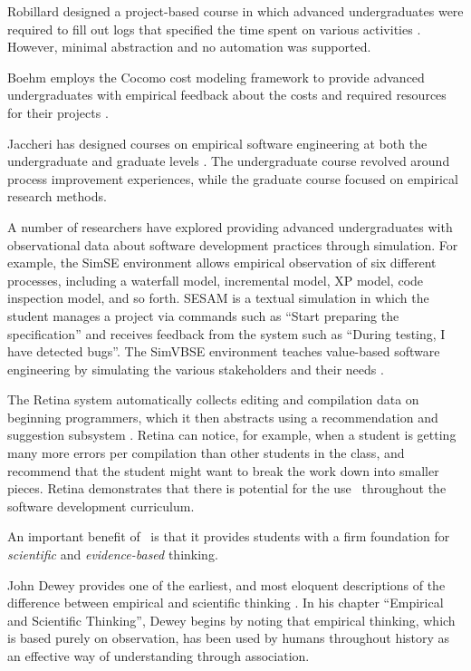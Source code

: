 Robillard designed a project-based course in which advanced undergraduates were required
to fill out logs that specified the time spent on various activities
\citep{Robillard98}.  However, minimal abstraction and no automation was supported.

Boehm employs the Cocomo cost modeling framework to provide advanced undergraduates with
empirical feedback about the costs and required resources for their
projects \citep{Valerdi07}.

Jaccheri has designed courses on empirical software engineering at both the 
undergraduate and graduate levels \citep{Dingsoyr99,Jaccheri05}.  The undergraduate course 
revolved around process improvement experiences, while the graduate course focused on 
empirical research methods.  

A number of researchers have explored providing advanced undergraduates
with observational data about software development practices through
simulation.  For example, the SimSE environment \citep{Navarro07,Navarro09}
allows empirical observation of six different processes, including a
waterfall model, incremental model, XP model, code inspection model, and so
forth.  SESAM \citep{Drappa00} is a textual simulation in which the student
manages a project via commands such as ``Start preparing the
specification'' and receives feedback from the system such as ``During
testing, I have detected bugs''.  The SimVBSE environment teaches
value-based software engineering by simulating the various stakeholders and
their needs \citep{Jain06}.

The Retina system automatically collects editing and compilation data on
beginning programmers, which it then abstracts using a recommendation and
suggestion subsystem \citep{Murphy09}.  Retina can notice, for example,
when a student is getting many more errors per compilation than other
students in the class, and recommend that the student might want to break
the work down into smaller pieces.  Retina demonstrates that there is
potential for the use \eCT\ throughout the software development curriculum.

An important benefit of \eCT\ is that it provides students with a firm
foundation for {\em scientific} and {\em evidence-based} thinking.

John Dewey provides one of the earliest, and most eloquent descriptions of
the difference between empirical and scientific thinking \citep{Dewey10}.
In his chapter ``Empirical and Scientific Thinking'', Dewey begins by
noting that empirical thinking, which is based purely on observation, has
been used by humans throughout history as an effective way of understanding
through association.

